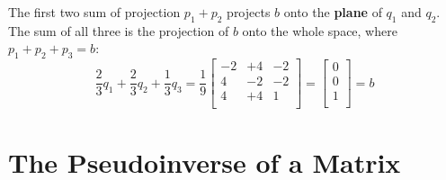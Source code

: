 The first two sum of projection \(p_1 + p_2\) projects \(b\) onto the \textbf{plane} of \(q_1\) and \(q_2\). The sum of all three is the projection of \(b\) onto the whole space, where \(p_1 + p_2 + p_3 = b\):
\[
    \frac{2}{3}q_1 + \frac{2}{3}q_2 + \frac{1}{3}q_3
    = \frac{1}{9}
    \begin{bmatrix}
        -2 & +4 & -2  \\
        4 & -2 & -2  \\
        4 & +4 & 1  \\
    \end{bmatrix}
    = 
    \begin{bmatrix}
         0 \\
         0 \\
         1 \\
    \end{bmatrix}
    = b 
\]      

\section{The Pseudoinverse of a Matrix}
